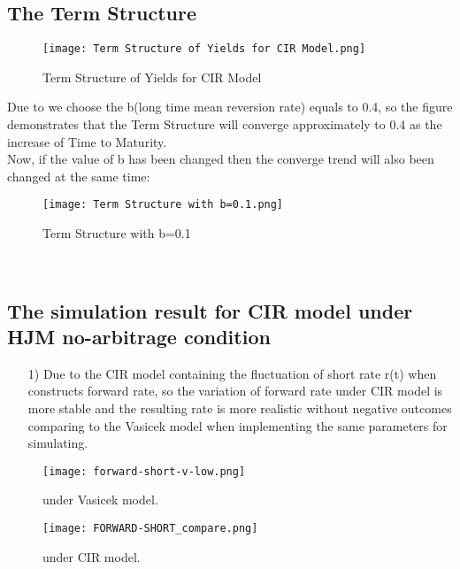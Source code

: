 \documentclass[14pt]{extarticle}
\begin{document}
\newpage
\subsection{The Term Structure}

\begin{figure}[H] 
    \centering 
    \texttt{[image: Term Structure of Yields for CIR Model.png]}
\caption{ Term Structure of Yields for CIR Model}
 \end{figure}
Due to we choose the b(long time mean reversion rate) equals to 0.4, so the figure demonstrates that the Term Structure will converge approximately to 0.4 as the increase of Time to Maturity.
~\\

Now, if the value of b has been changed then the converge trend will also been changed at the same time:


\begin{figure}[H] 
    \centering 
    \texttt{[image: Term Structure with b=0.1.png]}
\caption{ Term Structure with b=0.1}
 \end{figure}

~\\
\subsection{The simulation result for CIR model under HJM no-arbitrage condition}

\begin{itemize}
    \item [1)]Due to the CIR model containing the fluctuation of short rate r(t) when constructs forward rate, so the variation of forward rate under CIR model is more stable and the resulting rate is more realistic without negative outcomes comparing to the Vasicek model when implementing the same parameters for simulating. 
\end{itemize}

\begin{figure}[H]
	\begin{minipage}[t]{0.5\textwidth}
		\centering
		\texttt{[image: forward-short-v-low.png]}
		\caption{under Vasicek model.\label{fig:1}}
	\end{minipage}
	\qquad
	\begin{minipage}[t]{0.5\textwidth}
		\centering
		\texttt{[image: FORWARD-SHORT\_compare.png]}
		\caption{under CIR model.\label{fig:2}}
	\end{minipage}
\end{figure}
\end{document}
